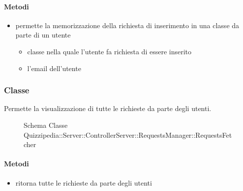 \paragraph{Metodi}
\begin{itemize}
\item {}
\newline
permette la memorizzazione della richiesta di inserimento in una classe da parte di un utente
\newline
{}
\newline
\begin{itemize}
\item {}
\newline
classe nella quale l'utente fa richiesta di essere inserito
\item {}
\newline
l'email dell'utente
\end{itemize}
\end{itemize}
\subsubsection{Classe }
Permette la visualizzazione di tutte le richieste da parte degli utenti.
\begin{figure}[H]
\centering
\noindent{}
\caption[Schema Classe RequestsFetcher]{Schema Classe Quizzipedia::Server::ControllerServer::RequestsManager::RequestsFetcher}
\end{figure}
\paragraph{Metodi}
\begin{itemize}
\item {}
\newline
ritorna tutte le richieste da parte degli utenti
\newline
\end{itemize}
